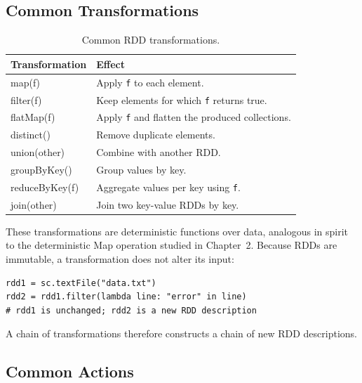 \documentclass[11pt,a4paper,oneside]{book}
\begin{document}
\subsection{Common Transformations}

\begin{table}[htbp]
\centering
\caption{Common RDD transformations.}
\label{tab:spark-transformations}
\begin{tabularx}{0.82\textwidth}{>{\ttfamily\raggedright\arraybackslash}p{3.2cm} Y}
\toprule
{}
\normalfont\bfseries Transformation & \normalfont\bfseries Effect \\
\midrule
map(f) & Apply \texttt{f} to each element. \\
filter(f) & Keep elements for which \texttt{f} returns true. \\
flatMap(f) & Apply \texttt{f} and flatten the produced collections. \\
distinct() & Remove duplicate elements. \\
union(other) & Combine with another RDD. \\
groupByKey() & Group values by key. \\
reduceByKey(f) & Aggregate values per key using \texttt{f}. \\
join(other) & Join two key-value RDDs by key. \\
\bottomrule
\end{tabularx}
\end{table}

These transformations are deterministic functions over data, analogous in spirit to the deterministic Map operation studied in Chapter~2. Because RDDs are immutable, a transformation does not alter its input:

\begin{lstlisting}[style=sparkcode]
rdd1 = sc.textFile("data.txt")
rdd2 = rdd1.filter(lambda line: "error" in line)
# rdd1 is unchanged; rdd2 is a new RDD description
\end{lstlisting}

A chain of transformations therefore constructs a chain of new RDD descriptions.

\subsection{Common Actions}
\end{document}
